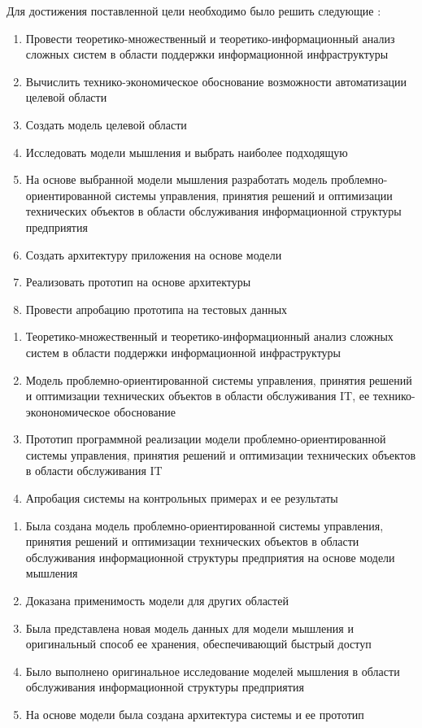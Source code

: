 Для достижения поставленной цели необходимо было решить следующие {\tasks}:
\begin{enumerate}
  \item Провести теоретико-множественный и теоретико-информационный анализ сложных систем в области поддержки информационной инфраструктуры
  \item Вычислить технико-экономическое обоснование возможности автоматизации целевой области
  \item Создать модель целевой области
  \item Исследовать модели мышления и выбрать наиболее подходящую
  \item На основе выбранной модели мышления разработать модель проблемно-ориентированной системы управления, принятия решений и оптимизации технических объектов в области обслуживания информационной структуры предприятия
  \item Создать архитектуру приложения на основе модели
  \item Реализовать прототип на основе архитектуры
  \item Провести апробацию прототипа на тестовых данных
\end{enumerate}

\begin{enumerate}
  \item Теоретико-множественный и теоретико-информационный анализ сложных систем в области поддержки информационной инфраструктуры
  \item Модель проблемно-ориентированной системы управления, принятия решений и оптимизации технических объектов в области обслуживания IT, ее технико-эконономическое обоснование  
  \item Прототип программной реализации модели проблемно-ориентированной системы управления, принятия решений и оптимизации технических объектов в области обслуживания IT  
  \item Апробация системы на контрольных примерах и ее результаты
\end{enumerate}

\novelty
\begin{enumerate}
  \item Была создана модель проблемно-ориентированной системы управления, принятия решений и оптимизации технических объектов в области обслуживания информационной структуры предприятия на основе модели мышления
  \item Доказана применимость модели для других областей
  \item Была представлена новая модель данных для модели мышления и оригинальный способ ее хранения, обеспечивающий быстрый доступ
  \item Было выполнено оригинальное исследование моделей мышления в области обслуживания информационной структуры предприятия
  \item На основе модели была создана архитектура системы и ее прототип 
\end{enumerate}

